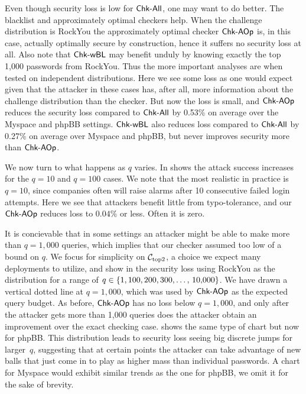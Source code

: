 Even though security loss is low for $\textnormal{\textsf{Chk-All}}$, one may  
want to do better. The blacklist and approximately
optimal checkers help. 
When the challenge distribution is RockYou the
approximately optimal checker $\textnormal{\textsf{Chk-AOp}}$ is, in this case, actually
optimally secure by
construction, hence it suffers no security loss at all. Also note that
$\textnormal{\textsf{Chk-wBL}}$ may benefit unduly by knowing exactly the top 1,000 passwords from
RockYou. Thus the more important analyses are when tested on independent
distributions. Here we see some loss as one would expect given that the attacker in these cases
has, after all, more information about the challenge distribution than the
checker. But now the loss is small, and $\textnormal{\textsf{Chk-AOp}}$ 
reduces the security loss compared to $\textnormal{\textsf{Chk-All}}$ by
0.53\% on average over the Myspace and phpBB settings. $\textnormal{\textsf{Chk-wBL}}$
also reduces loss compared to $\textnormal{\textsf{Chk-All}}$ by 0.27\% on average over Myspace
and phpBB, but never improves security more than $\textnormal{\textsf{Chk-AOp}}$.

We now turn to what happens as $q$ varies.
In  shows the attack success increases for the
$q = 10$ and $q = 100$ cases. We note that the most realistic in practice is
$q=10$, since companies often will raise alarms after 10 consecutive 
failed login attempts.  Here we see that attackers benefit little from
typo-tolerance, and our $\textnormal{\textsf{Chk-AOp}}$ reduces loss to $0.04\%$ or less. Often it
is zero.

It is concievable that in some settings 
an attacker might be able to make more than $q = 1,000$ queries, which implies
that our checker assumed too low of a bound on $q$.
We focus for simplicity on ${\mathcal C}_{\textrm{top2}}$,
a choice we expect many deployments to utilize, and show in 
 the security loss using RockYou as the distribution
for a range of $q \in \{1,100,200,300,\ldots,\,10\textnormal{,}000\}$.  We have
drawn a vertical dotted line at $q = 1,000$, which was used by $\textnormal{\textsf{Chk-AOp}}$
as the expected query budget. 
As before, $\textnormal{\textsf{Chk-AOp}}$ has no loss below $q = 1,000$, and 
only after the attacker gets more than 1,000 queries does the attacker
obtain an improvement over the exact checking case.  shows the same type of chart but now for phpBB.
This distribution leads to security loss seeing big discrete jumps 
for larger~$q$, suggesting that at certain points the attacker can take advantage of
new balls that just come in to play as higher mass than individual passwords.
A chart for Myspace would exhibit similar trends as the one for phpBB, we omit it for the sake
of brevity.

